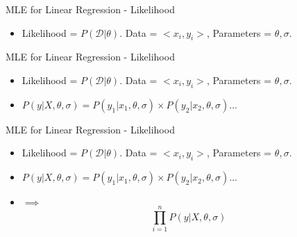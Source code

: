 \documentclass{beamer}
\DeclareMathOperator*{\argmin}{arg\,min}
\begin{document}

\begin{frame}{MLE for Linear Regression - Likelihood}
\begin{itemize}
\item Likelihood = $P(\mathcal{D}|\theta)$. Data = $<x_i, y_i>$, Parameters = $\theta, \sigma$.
    \end{itemize}

\end{frame}

\begin{frame}{MLE for Linear Regression - Likelihood}
\begin{itemize}
\item Likelihood = $P(\mathcal{D}|\theta)$. Data = $<x_i, y_i>$, Parameters = $\theta, \sigma$.
\item $P(y | X, \theta, \sigma) = P(y_1 | x_1, \theta, \sigma) \times P(y_2 | x_2, \theta, \sigma) \dots$

    \end{itemize}

\end{frame}
\begin{frame}{MLE for Linear Regression - Likelihood}
\begin{itemize}
\item Likelihood = $P(\mathcal{D}|\theta)$. Data = $<x_i, y_i>$, Parameters = $\theta, \sigma$.
\item $P(y | X, \theta, \sigma) = P(y_1 | x_1, \theta, \sigma) \times P(y_2 | x_2, \theta, \sigma) \dots$
\item $\implies$ \begin{equation*}
  \prod_{i=1}^{n} P(y | X, \theta, \sigma)
\end{equation*}

\end{itemize}

\end{frame}
\end{document}
